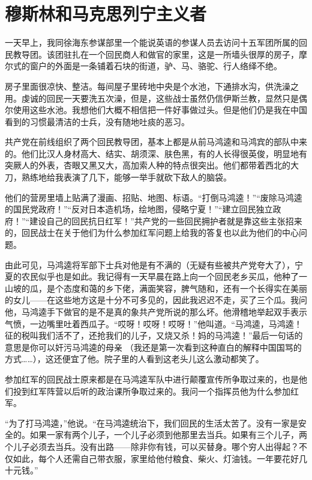 \documentclass[10pt]{book}
\begin{document}
\section{穆斯林和马克思列宁主义者}

一天早上，我同徐海东参谋部里一个能说英语的参谋人员去访问十五军团所属的回民教导团。该团驻扎在一个回民商人和做官的家里，这是一所墙头很厚的房子，摩尔式的窗户的外面是一条铺着石块的街道，驴、马、骆驼、行人络绎不绝。

房子里面很凉快、整洁。每间屋子里砖地中央是个水池，下通排水沟，供洗澡之用。虔诚的回民一天要洗五次澡，但是，这些战士虽然仍信伊斯兰教，显然只是偶尔使用这些水池。我想他们大概不相信把一件好事做过头。但是他们仍是我在中国看到的习惯最清洁的士兵，没有随地吐痰的恶习。

共产党在前线组织了两个回民教导团，基本上都是从前马鸿逵和马鸿宾的部队中来的。他们比汉人身材高大、结实、胡须深、肤色黑，有的人长得很英俊，明显地有突厥人的外表，杏眼又黑又大，高加索人种的特点很突出。他们都带着西北的大刀，熟练地给我表演了几下，能够一举手就砍下敌人的脑袋。

他们的营房里墙上贴满了漫画、招贴、地图、标语。“打倒马鸿逵！”“废除马鸿逵的国民党政府！”“反对日本造机场，绘地图，侵略宁夏！”“建立回民独立政府！”“建设自己的回民抗日红军！”共产党的一些回民拥护者就是靠这些主张招来的，回民战士在关于他们为什么参加红军问题上给我的答复也以此为他们的中心问题。

由此可见，马鸿逵将军部下士兵对他是有不满的（无疑有些被共产党夸大了），宁夏的农民似乎也是如此。我记得有一天早晨在路上向一个回民老乡买瓜，他种了一山坡的瓜，是个态度和蔼的乡下佬，满面笑容，脾气随和，还有一个长得实在美丽的女儿——在这些地方这是十分不可多见的，因此我迟迟不走，买了三个瓜。我问他，马鸿逵手下做官的是不是真的象共产党所说的那么坏。他滑稽地举起双手表示气愤，一边嘴里吐着西瓜子。“哎呀！哎呀！哎呀！”他叫道。“马鸿逵，马鸿逵！征的税叫我们活不了，还抢我们的儿子，又烧又杀！妈的马鸿逵！”最后一句话的意思是你可以奸污马鸿逵的母亲 （我还是第一次看到这种直白的解释中国国骂的方式……），这还便宜了他。院子里的人看到这老头儿这么激动都笑了。

参加红军的回民战士原来都是在马鸿逵军队中进行颠覆宣传所争取过来的，也是他们投到红军阵营以后听的政治课所争取过来的。我问一个指挥员他为什么参加红军。

“为了打马鸿逵，”他说。“在马鸿逵统治下，我们回民的生活太苦了。没有一家是安全的。如果一家有两个儿子，一个儿子必须到他那里去当兵。如果有三个儿子，两个儿子必须去当兵。没有出路——除非你有钱，可以买替身。哪个穷人出得起？不仅如此，每个人还需自己带衣服，家里给他付粮食、柴火、灯油钱。一年要花好几十元钱。”
\end{document}
